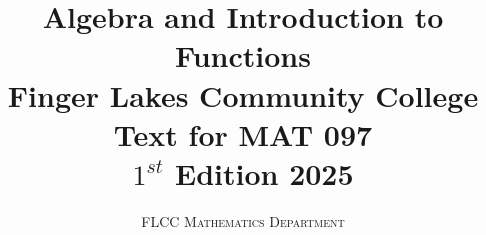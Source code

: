 \title{\textbf{\huge{Algebra and Introduction to Functions}} \\ Finger Lakes Community College \\ Text for MAT 097 \\ $1^{st}$ Edition 2025}
\author{\textsc{FLCC Mathematics Department}}

\maketitle